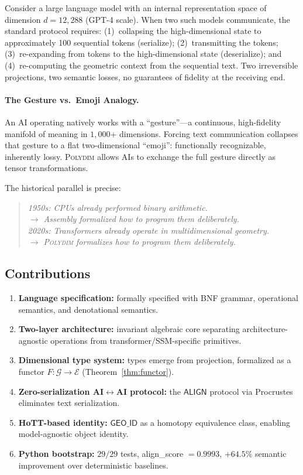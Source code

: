 \documentclass[10pt,twocolumn]{article}
\theoremstyle{plain}
\theoremstyle{definition}
\theoremstyle{remark}
\newcommand{\GeoID}{\mathsf{GEO\_ID}}
\newcommand{\Align}{\mathsf{ALIGN}}
\begin{document}
Consider a large language model with an internal representation space of
dimension $d = 12{,}288$ (GPT-4 scale). When two such models communicate, the
standard protocol requires:
(1)~collapsing the high-dimensional state to approximately 100 sequential tokens
(serialize); (2)~transmitting the tokens; (3)~re-expanding from tokens to the
high-dimensional state (deserialize); and (4)~re-computing the geometric context
from the sequential text. Two irreversible projections, two semantic losses, no
guarantees of fidelity at the receiving end.

\paragraph{The Gesture vs.~Emoji Analogy.} An AI operating natively works with
a ``gesture''---a continuous, high-fidelity manifold of meaning in $1{,}000$+
dimensions. Forcing text communication collapses that gesture to a flat
two-dimensional ``emoji'': functionally recognizable, inherently lossy.
\textsc{Polydim} allows AIs to exchange the full gesture directly as tensor
transformations.

The historical parallel is precise:
\begin{quote}
\textit{1950s: CPUs already performed binary arithmetic.\\
$\rightarrow$ Assembly formalized how to program them deliberately.\\[4pt]
2020s: Transformers already operate in multidimensional geometry.\\
$\rightarrow$ \textsc{Polydim} formalizes how to program them deliberately.}
\end{quote}

\subsection{Contributions}

\begin{enumerate}[leftmargin=*,label=\arabic*.]
\item \textbf{Language specification:} formally specified with BNF grammar,
      operational semantics, and denotational semantics.
\item \textbf{Two-layer architecture:} invariant algebraic core separating
      architecture-agnostic operations from transformer/SSM-specific primitives.
\item \textbf{Dimensional type system:} types emerge from projection, formalized
      as a functor $F\colon \mathcal{G} \to \mathcal{E}$ (Theorem~\ref{thm:functor}).
\item \textbf{Zero-serialization AI$\leftrightarrow$AI protocol:} the $\Align$
      protocol via Procrustes eliminates text serialization.
\item \textbf{HoTT-based identity:} $\GeoID$ as a homotopy equivalence class,
      enabling model-agnostic object identity.
\item \textbf{Python bootstrap:} $29/29$ tests, align\_score $= 0.9993$,
      $+64.5\%$ semantic improvement over deterministic baselines.
\end{enumerate}
\end{document}
